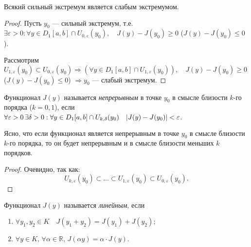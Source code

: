 \begin{utv}
	Всякий сильный экстремум является слабым экстремумом.
\end{utv}
\begin{proof}
	Пусть $y_0$ --- сильный экстремум, т.е. $\exists \varepsilon > 0 : \forall y \in D_1[a, b] \cap U_{0, \varepsilon}(y_0), \quad J(y) - J(y_0) \geqslant 0$ ($J(y) - J(y_0) \leqslant 0$).
	
	Рассмотрим $U_{1, \varepsilon}(y_0) \subset U_{0, \varepsilon}(y_0) \Rightarrow (\forall y \in D_1[a, b] \cap U_{1, \varepsilon}(y_0)), \quad J(y) - J(y_0) \geqslant 0$ ($J(y) - J(y_0) \leqslant 0$) $\Rightarrow y_0$ --- слабый экстремум. 
\end{proof}

\begin{definition}
	Функционал $J(y)$ называется \textit{непрерывным} в точке $y_0$ в смысле близости $k$-го порядка ($k = 0, 1$), если $\forall \varepsilon > 0 \, \exists \delta > 0 : \forall y \in D_1[a, b] \cap U_{k, \delta}(y_0) \quad \abs{J(y) - J(y_0)} < \varepsilon$.
\end{definition}

\begin{utv}
	Ясно, что если функционал является непрерывным в точке $y_0$ в смысле близости $k$-го порядка, то он будет непрерывным и в смысле близости меньших $k$ порядков.
\end{utv}
\begin{proof}
	Очевидно, так как:
	\begin{equation*}
		U_{k, \varepsilon}(y_0) \subset \dotsc \subset U_{1, \varepsilon}(y_0) \subset U_{0, \varepsilon}(y_0).
	\end{equation*}
\end{proof}

\begin{definition}
	Функционал $J(y)$ называется \textit{линейным}, если
	\begin{enumerate}
		\item $\forall y_1, y_2 \in K \quad J(y_1 + y_2) = J(y_1) + J(y_2)$;
		
		\item $\forall y \in K, \, \forall \alpha \in \mathbb{R}, \, J(\alpha y) = \alpha \cdot J(y)$.
	\end{enumerate}
\end{definition}


